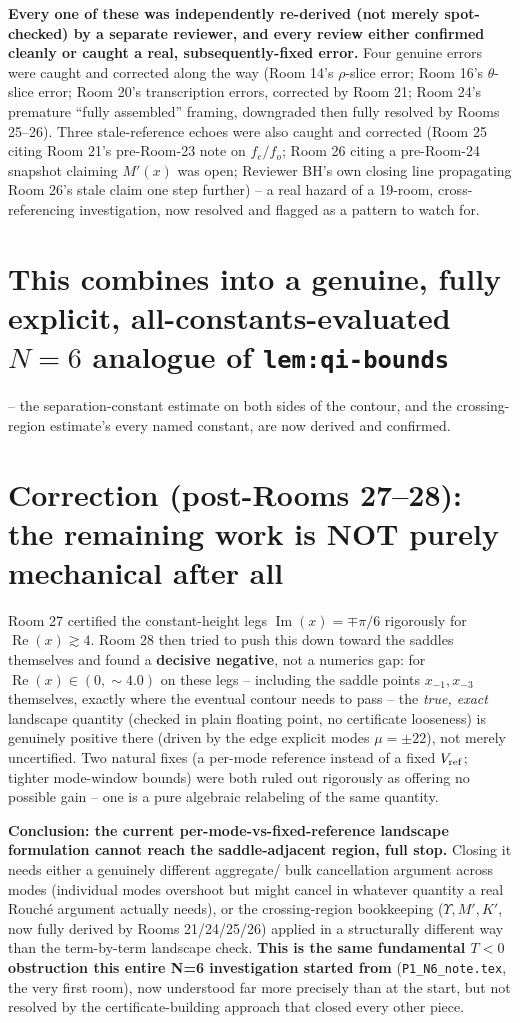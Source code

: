 \documentclass[11pt]{article}
\begin{document}
\noindent\textbf{Every one of these was independently re-derived (not merely spot-checked) by a
separate reviewer, and every review either confirmed cleanly or caught a real, subsequently-fixed
error.} Four genuine errors were caught and corrected along the way (Room 14's $\rho$-slice error;
Room 16's $\theta$-slice error; Room 20's transcription errors, corrected by Room 21; Room 24's
premature ``fully assembled'' framing, downgraded then fully resolved by Rooms 25--26). Three
stale-reference echoes were also caught and corrected (Room 25 citing Room 21's pre-Room-23 note on
$f_e/f_o$; Room 26 citing a pre-Room-24 snapshot claiming $M'(x)$ was open; Reviewer BH's own
closing line propagating Room 26's stale claim one step further) -- a real hazard of a
19-room, cross-referencing investigation, now resolved and flagged as a pattern to watch for.

\section*{This combines into a genuine, fully explicit, all-constants-evaluated $N=6$ analogue of
\texttt{lem:qi-bounds}} -- the separation-constant estimate on both sides of the contour, and the
crossing-region estimate's every named constant, are now derived and confirmed.

\section*{Correction (post-Rooms 27--28): the remaining work is NOT purely mechanical after all}

Room 27 certified the constant-height legs $\operatorname{Im}(x)=\mp\pi/6$ rigorously for
$\operatorname{Re}(x)\gtrsim4$. Room 28 then tried to push this down toward the saddles
themselves and found a \textbf{decisive negative}, not a numerics gap: for
$\operatorname{Re}(x)\in(0,\sim4.0)$ on these legs -- including the saddle points
$x_{-1},x_{-3}$ themselves, exactly where the eventual contour needs to pass -- the
\emph{true, exact} landscape quantity (checked in plain floating point, no certificate
looseness) is genuinely positive there (driven by the edge explicit modes $\mu=\pm22$), not
merely uncertified. Two natural fixes (a per-mode reference instead of a fixed $V_{\rm ref}$;
tighter mode-window bounds) were both ruled out rigorously as offering no possible gain -- one is
a pure algebraic relabeling of the same quantity.

\textbf{Conclusion: the current per-mode-vs-fixed-reference landscape formulation cannot reach
the saddle-adjacent region, full stop.} Closing it needs either a genuinely different aggregate/
bulk cancellation argument across modes (individual modes overshoot but might cancel in whatever
quantity a real Rouch\'e argument actually needs), or the crossing-region bookkeeping
($\Upsilon,M',K'$, now fully derived by Rooms 21/24/25/26) applied in a structurally different
way than the term-by-term landscape check. \textbf{This is the same fundamental $T<0$ obstruction
this entire N=6 investigation started from} (\texttt{P1\_N6\_note.tex}, the very first room),
now understood far more precisely than at the start, but not resolved by the certificate-building
approach that closed every other piece.
\end{document}
